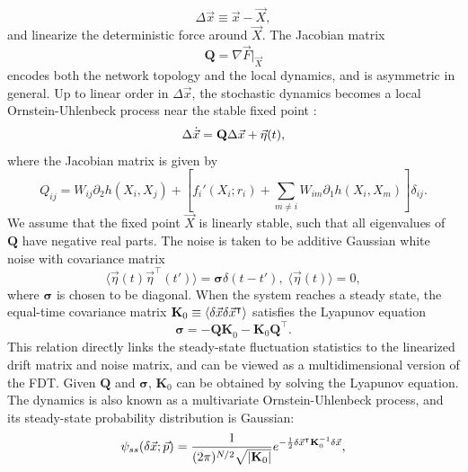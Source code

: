 \begin{equation}
    \Delta \vec{x} \equiv \vec{x} - \vec{X},
\end{equation}
and linearize the deterministic force around $\vec{X}$. The Jacobian matrix
\begin{equation}
    \mathbf{Q} = \nabla \vec{F}\big|_{\vec{X}}
\end{equation}
encodes both the network topology and the local dynamics, and is asymmetric in general. Up to linear order in $\Delta \vec{x}$, the stochastic dynamics becomes a local Ornstein-Uhlenbeck process near the stable fixed point \cite{doi:10.1073/pnas.0506347102}:
\begin{equation}
    \Delta \dot{\vec{x}} = {\bf Q}\Delta \vec{x} + \vec{\eta}(t),
    \label{linearized_dynamics}
\end{equation}
where the Jacobian matrix is given by
\begin{equation}
    Q_{ij} = W_{ij} \partial_2 h(X_i,X_j) + \left[ f_i'(X_i;r_i) + \sum_{m\neq i} W_{im} \partial_1 h(X_i,X_m) \right] \delta_{ij}.
    \label{Qij_definition}
\end{equation}
We assume that the fixed point $\vec{X}$ is linearly stable, such that all eigenvalues of $\mathbf{Q}$ have negative real parts. The noise is taken to be additive Gaussian white noise with covariance matrix
\begin{equation}
    \langle \vec{\eta}(t) \vec{\eta}^\intercal(t') \rangle = \boldsymbol{\sigma} \delta (t-t'),\;\langle \vec{\eta}(t) \rangle = 0,
\end{equation}
where $\boldsymbol{\sigma}$ is chosen to be diagonal. When the system reaches a steady state, the equal-time covariance matrix ${\bf K}_0 \equiv \langle \delta \vec{x} \delta \vec{x}^\intercal \rangle$ satisfies the Lyapunov equation
\begin{equation}
    \boldsymbol{\sigma} = -\mathbf{Q K}_0 - \mathbf{K}_0 \mathbf{Q}^\intercal.
    \label{Lyapunov_eq}
\end{equation}
This relation directly links the steady-state fluctuation statistics to the linearized drift matrix and noise matrix, and can be viewed as a multidimensional version of the FDT. Given $\mathbf{Q}$ and $\boldsymbol{\sigma}$, $\mathbf{K}_0$ can be obtained by solving the Lyapunov equation. The dynamics is also known as a multivariate Ornstein-Uhlenbeck process, and its steady-state probability distribution is Gaussian:
\begin{equation}
    \psi_{ss}(\delta \vec{x}; \vec{p}) = \frac{1}{(2\pi)^{N/2}\sqrt{|{\bf K}_0|}} e^{-\frac{1}{2} \delta \vec{x}^\intercal {\bf K}^{-1}_0 \delta \vec{x}},
    \label{steady-state prob}
\end{equation}

